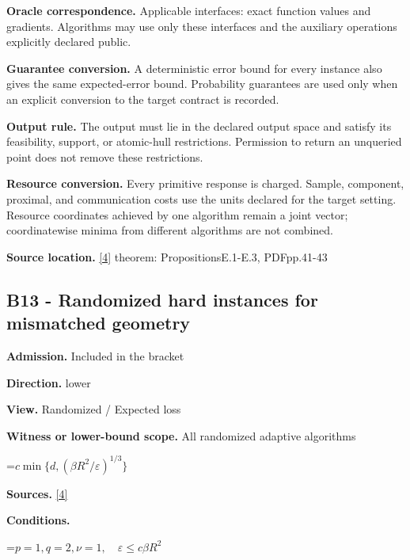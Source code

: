 \documentclass[10pt,a4paper]{article}
\newcommand{\AtlasMath}[1]{\par\begingroup\centering\setbox0=\hbox{$\displaystyle #1$}\ifdim\wd0>1.4\linewidth\typeout{ATLAS WIDE FORMULA: \the\wd0}\fi\ifdim\wd0>\linewidth\resizebox{\linewidth}{!}{\box0}\else\box0\fi\par\endgroup}
\begin{document}
\textbf{Oracle correspondence.} Applicable interfaces: exact function values and gradients. Algorithms may use only these interfaces and the auxiliary operations explicitly declared public.



\textbf{Guarantee conversion.} A deterministic error bound for every instance also gives the same expected-error bound. Probability guarantees are used only when an explicit conversion to the target contract is recorded.



\textbf{Output rule.} The output must lie in the declared output space and satisfy its feasibility, support, or atomic-hull restrictions. Permission to return an unqueried point does not remove these restrictions.



\textbf{Resource conversion.} Every primitive response is charged. Sample, component, proximal, and communication costs use the units declared for the target setting. Resource coordinates achieved by one algorithm remain a joint vector; coordinatewise minima from different algorithms are not combined.



\textbf{Source location.} \href{https://arxiv.org/pdf/2609.32910}{[4]} theorem: PropositionsE.1-E.3, PDFpp.41-43



\subsection{B13 - Randomized hard instances for mismatched geometry}


\textbf{Admission.} Included in the bracket



\textbf{Direction.} lower



\textbf{View.} Randomized / Expected loss



\textbf{Witness or lower-bound scope.} All randomized adaptive algorithms



\AtlasMath{c\min\{d,(\beta R^2/\varepsilon)^{1/3}\}}


\textbf{Sources.} \href{https://arxiv.org/pdf/2609.32910}{[4]}



\textbf{Conditions.}
\AtlasMath{p=1,q=2,\nu=1,\quad\varepsilon\le c\beta R^2}
\end{document}
